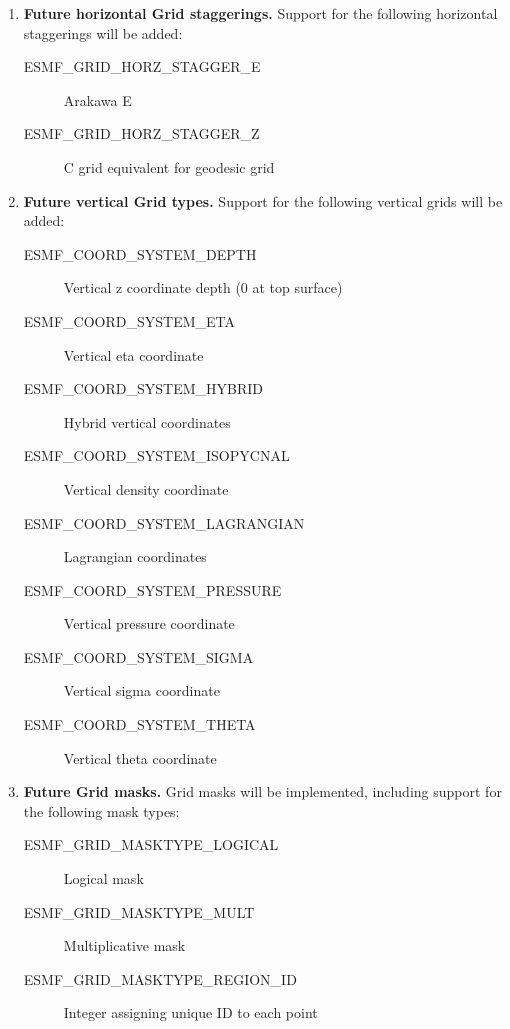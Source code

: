 \begin{enumerate}
\item {\bf Future horizontal Grid staggerings.}  Support for the following
horizontal staggerings will be added:
 \begin{description}
    \item [ESMF\_GRID\_HORZ\_STAGGER\_E]
          Arakawa E
    \item [ESMF\_GRID\_HORZ\_STAGGER\_Z]
          C grid equivalent for geodesic grid
 \end{description}

\item {\bf Future vertical Grid types.}  Support for the following
vertical grids will be added:
 \begin{description}
    \item [ESMF\_COORD\_SYSTEM\_DEPTH]
          Vertical z coordinate depth (0 at top surface)
    \item [ESMF\_COORD\_SYSTEM\_ETA]
          Vertical eta coordinate
    \item [ESMF\_COORD\_SYSTEM\_HYBRID]
          Hybrid vertical coordinates
    \item [ESMF\_COORD\_SYSTEM\_ISOPYCNAL]
          Vertical density coordinate
    \item [ESMF\_COORD\_SYSTEM\_LAGRANGIAN]
          Lagrangian coordinates
    \item [ESMF\_COORD\_SYSTEM\_PRESSURE]
          Vertical pressure coordinate
    \item [ESMF\_COORD\_SYSTEM\_SIGMA]
          Vertical sigma coordinate
    \item [ESMF\_COORD\_SYSTEM\_THETA]
          Vertical theta coordinate
 \end{description}

\item {\bf Future Grid masks.}  Grid masks will be implemented, including
support for the following mask types:
 \begin{description}
    \item [ESMF\_GRID\_MASKTYPE\_LOGICAL]
          Logical mask
    \item [ESMF\_GRID\_MASKTYPE\_MULT]
          Multiplicative mask
    \item [ESMF\_GRID\_MASKTYPE\_REGION\_ID]
          Integer assigning unique ID to each point
 \end{description}

\end{enumerate}


